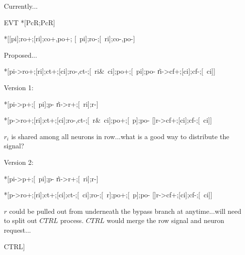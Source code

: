 \documentclass[aer.tex]{subfiles}
\begin{document}

Currently...

\begin{csp}
EVT\equiv
  *[Pc\star\!R;Pc\star\!R]
\end{csp}

\begin{hse}
*[[pi];ro+;[ri];co+,po+;
 [~pi];ro-;[~ri];co-,po-]
\end{hse}

Proposed...

\begin{hse}
*[pi->ro+;[ri];ct+;[ci];ro-,ct-;[~ri&~ci];po+;[~pi];po-
 \|ri->cf+;[ci];cf-;[~ci]]
\end{hse}

Version 1:

\begin{hse}
*[pi->p+;[~pi];p-
 \|ri->r+;[~ri];r-]

*[p->ro+;[ri];ct+;[ci];ro-,ct-;[~r&~ci];po+;[~p];po-
 []r->cf+;[ci];cf-;[~ci]]
\end{hse}

$r_i$ is shared among all neurons in row...what is a good way to distribute the signal?

Version 2:

\begin{hse}
*[pi->p+;[~pi];p-
 \|ri->r+;[~ri];r-]

*[p->ro+;[ri];ct+;[ci];ct-;[~ci];ro-;[~r];po+;[~p];po-
 []r->cf+;[ci];cf-;[~ci]]
\end{hse}

$r$ could be pulled out from underneath the bypass branch at anytime...will need to split out $CTRL$ process. $CTRL$ would merge the row signal and neuron request...

\begin{csp}
CTRL\equiv*[[]]
\end{csp}
\end{document}

